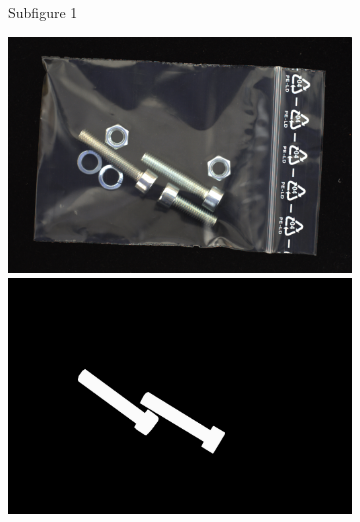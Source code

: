 \begin{figure}[H]
\begin{subfigure}[b]{0.48\textwidth}
\begin{minipage}{0.32\textwidth}
        \end{minipage}
        \caption{Subfigure 1}
    \end{subfigure}
    \hfill
    \begin{subfigure}[b]{0.48\textwidth}
        \centering
        \begin{minipage}{0.32\textwidth}
            \centering
            \includegraphics[width=\textwidth]{figures/DRAEMweakness/logical042image.png}
        \end{minipage}
        \begin{minipage}{0.32\textwidth}
            \centering
            \includegraphics[width=\textwidth]{figures/DRAEMweakness/logical042mask.png}
        \end{minipage}
        \begin{minipage}{0.32\textwidth}
            \centering

\end{minipage}
\end{subfigure}
\end{figure}
